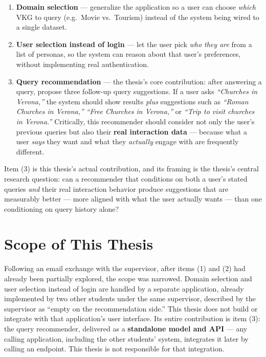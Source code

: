 \documentclass[11pt,a4paper,oneside]{book}
\begin{document}
\begin{enumerate}[label=(\arabic*)]
    \item \textbf{Domain selection} --- generalize the application so a user can choose \emph{which}
        VKG to query (e.g.\ Movie vs.\ Tourism) instead of the system being wired to a single
        dataset.
    \item \textbf{User selection instead of login} --- let the user pick \emph{who they are} from a
        list of personas, so the system can reason about that user's preferences, without
        implementing real authentication.
    \item \textbf{Query recommendation} --- the thesis's core contribution: after answering a
        query, propose three follow-up query suggestions. If a user asks \emph{``Churches in
        Verona,''} the system should show results \emph{plus} suggestions such as \emph{``Roman
        Churches in Verona,''} \emph{``Free Churches in Verona,''} or \emph{``Trip to visit churches
        in Verona.''} Critically, this recommender should consider not only the user's previous
        queries but also their \textbf{real interaction data} --- because what a user \emph{says}
        they want and what they \emph{actually} engage with are frequently different.
\end{enumerate}

Item (3) is this thesis's actual contribution, and its framing is the thesis's central research
question: can a recommender that conditions on both a user's stated queries \emph{and} their real
interaction behavior produce suggestions that are measurably better --- more aligned with what the
user actually wants --- than one conditioning on query history alone?

\section{Scope of This Thesis}
\label{sec:intro-scope}

Following an email exchange with the supervisor, after items (1) and (2) had already been partially
explored, the scope was narrowed. Domain selection and user selection instead of login are handled
by a separate application, already implemented by two other students under the same supervisor,
described by the supervisor as ``empty on the recommendation side.'' This thesis does not build or
integrate with that application's user interface. Its entire contribution is item (3): the query
recommender, delivered as a \textbf{standalone model and API} --- any calling application,
including the other students' system, integrates it later by calling an endpoint. This thesis is
not responsible for that integration.
\end{document}
